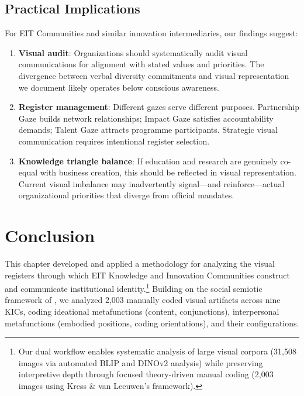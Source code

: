 \documentclass[../main.tex]{subfiles}
\begin{document}
\subsection{Practical Implications}

For EIT Communities and similar innovation intermediaries, our findings suggest:

\begin{enumerate}
    \item \textbf{Visual audit}: Organizations should systematically audit visual communications for alignment with stated values and priorities. The divergence between verbal diversity commitments and visual representation we document likely operates below conscious awareness.

    \item \textbf{Register management}: Different gazes serve different purposes. Partnership Gaze builds network relationships; Impact Gaze satisfies accountability demands; Talent Gaze attracts programme participants. Strategic visual communication requires intentional register selection.

    \item \textbf{Knowledge triangle balance}: If education and research are genuinely co-equal with business creation, this should be reflected in visual representation. Current visual imbalance may inadvertently signal---and reinforce---actual organizational priorities that diverge from official mandates.
\end{enumerate}

\section{Conclusion}

This chapter developed and applied a methodology for analyzing the visual registers through which EIT Knowledge and Innovation Communities construct and communicate institutional identity.\footnote{Our dual workflow enables systematic analysis of large visual corpora (31,508 images via automated BLIP and DINOv2 analysis) while preserving interpretive depth through focused theory-driven manual coding (2,003 images using Kress \& van Leeuwen's framework).} Building on the social semiotic framework of \cite{jancsary2018institutions}, we analyzed 2,003 manually coded visual artifacts across nine KICs, coding ideational metafunctions (content, conjunctions), interpersonal metafunctions (embodied positions, coding orientations), and their configurations.
\end{document}
